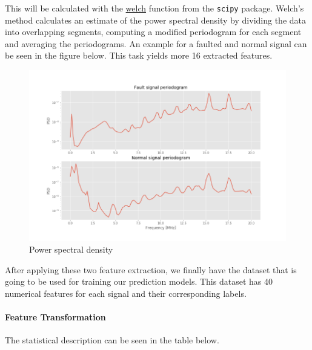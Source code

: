 \documentclass[11pt]{article}
\makeatletter
\def\maxwidth{\ifdim\Gin@nat@width>\linewidth\linewidth
    \else\Gin@nat@width\fi}
\let\Oldincludegraphics\includegraphics
\renewcommand{\includegraphics}[1]{\Oldincludegraphics[width=.8\maxwidth]{#1}}
\makeatother
\begin{document}
This will be calculated with the
\href{https://docs.scipy.org/doc/scipy-0.14.0/reference/generated/scipy.signal.welch.html}{welch}
function from the \texttt{scipy} package. Welch's method calculates an
estimate of the power spectral density by dividing the data into
overlapping segments, computing a modified periodogram for each segment
and averaging the periodograms. An example for a faulted and normal
signal can be seen in the figure below. This task yields more 16
extracted features.

\begin{figure}
\centering
\includegraphics{signal_fault_normal_psd_denoised.png}
\caption{Power spectral density}
\end{figure}

After applying these two feature extraction, we finally have the dataset
that is going to be used for training our prediction models. This
dataset has 40 numerical features for each signal and their
corresponding labels.

\hypertarget{feature-transformation}{%
\paragraph{Feature Transformation}\label{feature-transformation}}

The statistical description can be seen in the table below.
\end{document}
